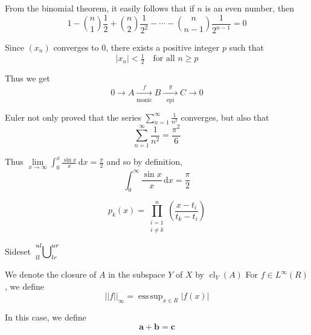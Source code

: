 \documentclass{article}
\DeclareMathOperator{\cl}{cl}
\DeclareMathOperator*{\esup}{ess\,sup}
\begin{document}
From the binomial theorem, it easily follows that if $n$ is an even
number, then
\begin{equation*}
1-\binom{n}{1}\frac{1}{2}+\binom{n}{2}\frac{1}{2^2}-\dotsb
-\binom{n}{n-1}\frac{1}{2^{n-1}}=0
\end{equation*}

Since $(x_n)$ converges to $0$, there exists a positive integer $p$
such that
\begin{equation*}
|x_n|<\tfrac{1}{2}\quad\text{for all $n\ge p$}
\end{equation*}

Thus we get
\begin{equation*}
0\xrightarrow{} A\xrightarrow[\text{monic}]{f}
B\xrightarrow[\hspace{7pt}\text{epi}\hspace{7pt}]{g}
C\xrightarrow{}0
\end{equation*}

Euler not only proved that the series
$\sum_{n=1}^\infty\frac{1}{n^2}$ converges, but also that
\begin{equation*}
\sum_{n=1}^\infty\frac{1}{n^2}=\frac{\pi^2}{6}
\end{equation*}

Thus
$\lim\limits_{x\to\infty}\int_0^x\frac{\sin x}{x}\,\mathrm{d}x
=\frac{\pi}{2}$
and so by definition,
\begin{equation*}
\int_0^\infty\frac{\sin x}{x}\,\mathrm{d}x=\frac{\pi}{2}
\end{equation*}

\begin{equation*}
p_k(x)=\prod_{\substack{i=1\\i\ne k}}^n
\left(\frac{x-t_i}{t_k-t_i}\right)
\end{equation*}

Sideset
$\sideset{_{ll}^{ul}}{_{lr}^{ur}}\bigcup$

We denote the closure of $A$ in the subspace $Y$ of $X$ by
$\cl_Y(A)$
For $f\in L^\infty(R)$, we define
\begin{equation*}
||f||_\infty=\esup_{x\in R}|f(x)|
\end{equation*}

In this case, we define
\begin{equation*}
\boldsymbol{a}+\boldsymbol{b}=\boldsymbol{c}
\end{equation*}
\end{document}

